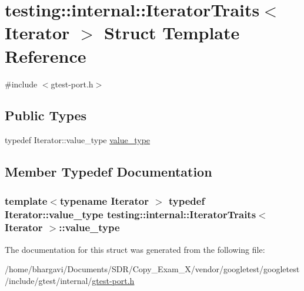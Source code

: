 \hypertarget{structtesting_1_1internal_1_1_iterator_traits}{}\section{testing\+:\+:internal\+:\+:Iterator\+Traits$<$ Iterator $>$ Struct Template Reference}
\label{structtesting_1_1internal_1_1_iterator_traits}


{\ttfamily \#include $<$gtest-\/port.\+h$>$}

\subsection*{Public Types}
\begin{DoxyCompactItemize}
\item 
typedef Iterator\+::value\+\_\+type \hyperlink{structtesting_1_1internal_1_1_iterator_traits_a29de4320a9c53ce438d3561b94e515bb}{value\+\_\+type}
\end{DoxyCompactItemize}


\subsection{Member Typedef Documentation}
\subsubsection[{\texorpdfstring{value\+\_\+type}{value_type}}]{\setlength{\rightskip}{0pt plus 5cm}template$<$typename Iterator $>$ typedef Iterator\+::value\+\_\+type {\bf testing\+::internal\+::\+Iterator\+Traits}$<$ Iterator $>$\+::{\bf value\+\_\+type}}\hypertarget{structtesting_1_1internal_1_1_iterator_traits_a29de4320a9c53ce438d3561b94e515bb}{}\label{structtesting_1_1internal_1_1_iterator_traits_a29de4320a9c53ce438d3561b94e515bb}


The documentation for this struct was generated from the following file\+:\begin{DoxyCompactItemize}
\item 
/home/bhargavi/\+Documents/\+S\+D\+R/\+Copy\+\_\+\+Exam\+\_\+X/vendor/googletest/googletest/include/gtest/internal/\hyperlink{gtest-port_8h}{gtest-\/port.\+h}\end{DoxyCompactItemize}
